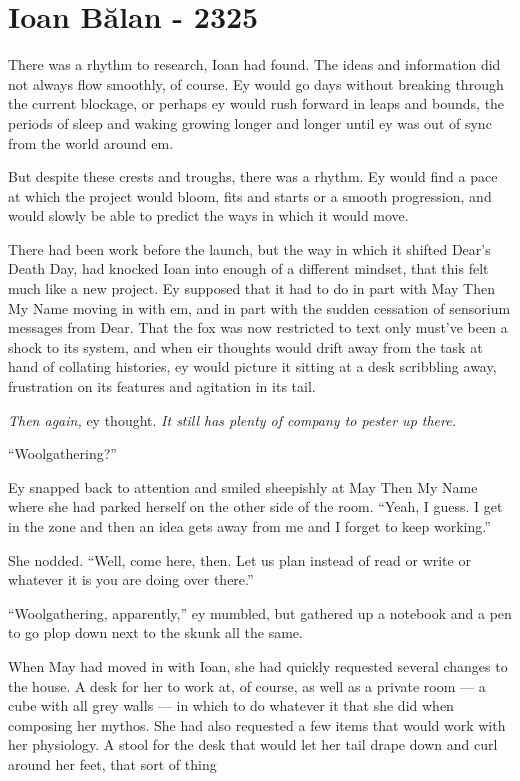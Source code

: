 \hypertarget{ioan-bux103lan—2325}{%
\chapter{Ioan Bălan - 2325}\label{ioan-bux103lan—2325}}

There was a rhythm to research, Ioan had found. The ideas and information did not always flow smoothly, of course. Ey would go days without breaking through the current blockage, or perhaps ey would rush forward in leaps and bounds, the periods of sleep and waking growing longer and longer until ey was out of sync from the world around em.

But despite these crests and troughs, there was a rhythm. Ey would find a pace at which the project would bloom, fits and starts or a smooth progression, and would slowly be able to predict the ways in which it would move.

There had been work before the launch, but the way in which it shifted Dear's Death Day, had knocked Ioan into enough of a different mindset, that this felt much like a new project. Ey supposed that it had to do in part with May Then My Name moving in with em, and in part with the sudden cessation of sensorium messages from Dear. That the fox was now restricted to text only must've been a shock to its system, and when eir thoughts would drift away from the task at hand of collating histories, ey would picture it sitting at a desk scribbling away, frustration on its features and agitation in its tail.

\emph{Then again,} ey thought. \emph{It still has plenty of company to pester up there.}

``Woolgathering?''

Ey snapped back to attention and smiled sheepishly at May Then My Name where she had parked herself on the other side of the room. ``Yeah, I guess. I get in the zone and then an idea gets away from me and I forget to keep working.''

She nodded. ``Well, come here, then. Let us plan instead of read or write or whatever it is you are doing over there.''

``Woolgathering, apparently,'' ey mumbled, but gathered up a notebook and a pen to go plop down next to the skunk all the same.

When May had moved in with Ioan, she had quickly requested several changes to the house. A desk for her to work at, of course, as well as a private room — a cube with all grey walls — in which to do whatever it that she did when composing her mythos. She had also requested a few items that would work with her physiology. A stool for the desk that would let her tail drape down and curl around her feet, that sort of thing


